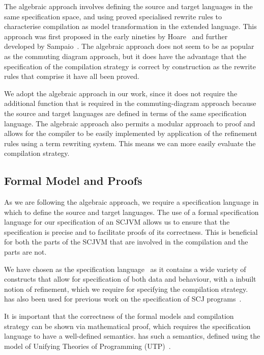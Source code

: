 The algebraic approach involves defining the source and target
languages in the same specification space, and using proved
specialised rewrite rules to characterise compilation as model
transformation in the extended language.
This approach was first proposed in the early nineties by
Hoare~\cite{hoare1991} and further developed by
Sampaio~\cite{hoare1993, sampaio1993}.
The algebraic approach does not seem to be as popular as the commuting
diagram approach, but it does have the advantage that the
specification of the compilation strategy is correct by construction
as the rewrite rules that comprise it have all been proved.

We adopt the algebraic approach in our work, since it does not require
the additional function that is required in the commuting-diagram
approach because the source and target languages are defined in terms
of the same specification language.
The algebraic approach also permits a modular approach to proof and
allows for the compiler to be easily implemented by application of the
refinement rules using a term rewriting system.
This means we can more easily evaluate the compilation strategy.

\subsection{Formal Model and Proofs}

As we are following the algebraic approach, we require a specification
language in which to define the source and target languages.
The use of a formal specification language for our specification of an
SCJVM allows us to ensure that the specification is precise and to
facilitate proofs of its correctness.
This is beneficial for both the parts of the SCJVM that are involved
in the compilation and the parts are not.

We have chosen \Circus{} as the specification
language~\cite{oliveira2009} as it contains a wide variety of
constructs that allow for specification of both data and behaviour,
with a inbuilt notion of refinement, which we require for specifying
the compilation strategy.
\Circus{} has also been used for previous work on the specification of
SCJ programs~\cite{cavalcanti2011, cavalcanti2013}.

It is important that the correctness of the formal models and
compilation strategy can be shown via mathematical proof, which
requires the specification language to have a well-defined semantics.
\Circus{} has such a semantics, defined using the model of Unifying
Theories of Programming (UTP)~\cite{hoare1998}.

